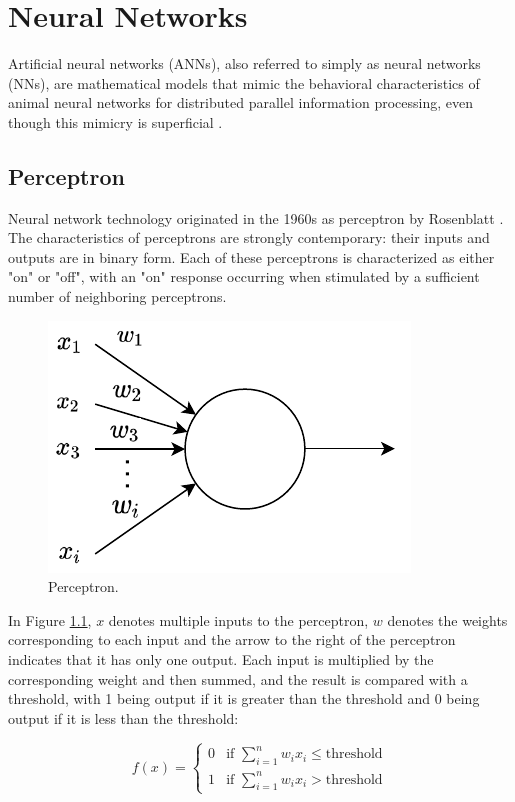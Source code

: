 \documentclass[
	parskip, 			   %
	twoside, 			   %
	DIV=14, 			   %
	BCOR=15.0mm, 		   %
	headsepline, 		   %
	open=right, 		   %
	captions=tableheading, %
	bibliography=totoc,    %
	numbers=noenddot       %
]{scrreprt}
\begin{document}
\clearpage
\chapter{Neural Networks}
\label{ch:chapter4}
Artificial neural networks (ANNs), also referred to simply as neural networks (NNs), are mathematical models that mimic the behavioral characteristics of animal neural networks for distributed parallel information processing, even though this mimicry is superficial \cite{russell2010artificial}.

\section{Perceptron}
Neural network technology originated in the 1960s as perceptron by Rosenblatt \cite{rosenblatt1958perceptron}. The characteristics of perceptrons are strongly contemporary: their inputs and outputs are in binary form. Each of these perceptrons is characterized as either "on" or "off", with an "on" response occurring when stimulated by a sufficient number of neighboring perceptrons.

\begin{figure}[h!]
    \centering
    \includegraphics[scale=1]{figures/perceptron.pdf}
    \caption{Perceptron.}
    \label{fig:perceptron}
\end{figure}

In Figure \ref{fig:perceptron}, $x$ denotes multiple inputs to the perceptron, $w$ denotes the weights corresponding to each input and the arrow to the right of the perceptron indicates that it has only one output. Each input is multiplied by the corresponding weight and then summed, and the result is compared with a threshold, with 1 being output if it is greater than the threshold and 0 being output if it is less than the threshold:

\begin{equation}
    \label{eq:perceptron_1}
    f(x)=\begin{cases}0 & \text{if } \sum\nolimits_{i=1}^n w_{i} x_{i} \leq \text{threshold} \\ 1 & \text{if } \sum\nolimits_{i=1}^n w_{i} x_{i}>\text{threshold}\end{cases}
\end{equation}
\end{document}
